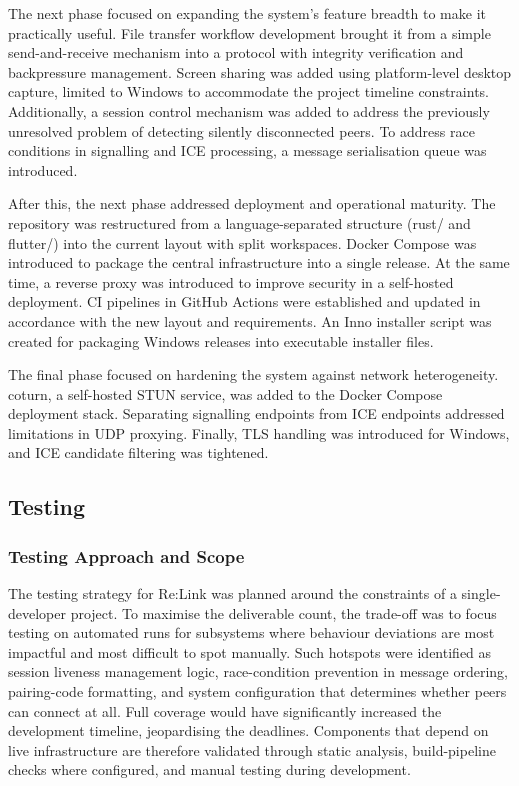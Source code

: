 \documentclass[12pt,a4paper]{article}
\begin{document}
The next phase focused on expanding the system’s feature breadth to make it practically useful. File transfer workflow development brought it from a simple send-and-receive mechanism into a protocol with integrity verification and backpressure management. Screen sharing was added using platform-level desktop capture, limited to Windows to accommodate the project timeline constraints. Additionally, a session control mechanism was added to address the previously unresolved problem of detecting silently disconnected peers. To address race conditions in signalling and ICE processing, a message serialisation queue was introduced.

After this, the next phase addressed deployment and operational maturity. The repository was restructured from a language-separated structure (rust/ and flutter/) into the current layout with split workspaces. Docker Compose was introduced to package the central infrastructure into a single release. At the same time, a reverse proxy was introduced to improve security in a self-hosted deployment. CI pipelines in GitHub Actions were established and updated in accordance with the new layout and requirements. An Inno installer script was created for packaging Windows releases into executable installer files.

The final phase focused on hardening the system against network heterogeneity. coturn, a self-hosted STUN service, was added to the Docker Compose deployment stack. Separating signalling endpoints from ICE endpoints addressed limitations in UDP proxying. Finally, TLS handling was introduced for Windows, and ICE candidate filtering was tightened.

\subsection{Testing}

\subsubsection{Testing Approach and Scope}

The testing strategy for Re:Link was planned around the constraints of a single-developer project. To maximise the deliverable count, the trade-off was to focus testing on automated runs for subsystems where behaviour deviations are most impactful and most difficult to spot manually. Such hotspots were identified as session liveness management logic, race-condition prevention in message ordering, pairing-code formatting, and system configuration that determines whether peers can connect at all. Full coverage would have significantly increased the development timeline, jeopardising the deadlines. Components that depend on live infrastructure are therefore validated through static analysis, build-pipeline checks where configured, and manual testing during development.
\end{document}
